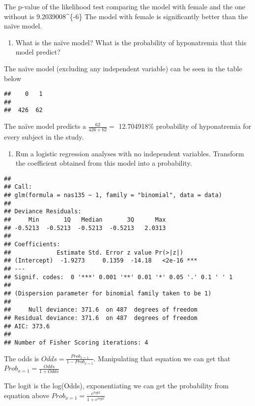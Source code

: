 \documentclass[]{article}
\begin{document}
The p-value of the likelihood test comparing the model with female and
the one without is 9.2039008\^{}\{-6\} The model with female is
significantly better than the naïve model.

\begin{enumerate}
\def\labelenumi{\alph{enumi}.}
\setcounter{enumi}{2}
\itemsep1pt\parskip0pt
\item
  What is the naïve model? What is the probability of hyponatremia that
  this model predict?
\end{enumerate}

The naïve model (excluding any independent variable) can be seen in the
table below

\begin{verbatim}
##    0   1
##         
##  426  62
\end{verbatim}

The naïve model predicts a $\frac{62}{426+62}=$ 12.704918\% probability
of hyponatremia for every subject in the study.

\begin{enumerate}
\def\labelenumi{\alph{enumi}.}
\setcounter{enumi}{3}
\itemsep1pt\parskip0pt
\item
  Run a logistic regression analyses with no independent variables.
  Transform the coefficient obtained from this model into a probability.
\end{enumerate}

\begin{verbatim}
## 
## Call:
## glm(formula = nas135 ~ 1, family = "binomial", data = data)
## 
## Deviance Residuals: 
##     Min       1Q   Median       3Q      Max  
## -0.5213  -0.5213  -0.5213  -0.5213   2.0313  
## 
## Coefficients:
##             Estimate Std. Error z value Pr(>|z|)    
## (Intercept)  -1.9273     0.1359  -14.18   <2e-16 ***
## ---
## Signif. codes:  0 '***' 0.001 '**' 0.01 '*' 0.05 '.' 0.1 ' ' 1
## 
## (Dispersion parameter for binomial family taken to be 1)
## 
##     Null deviance: 371.6  on 487  degrees of freedom
## Residual deviance: 371.6  on 487  degrees of freedom
## AIC: 373.6
## 
## Number of Fisher Scoring iterations: 4
\end{verbatim}

The odds is $Odds=\frac{Prob_{x=1}}{1-Prob_{x=1}}$. Manipulating that
equation we can get that $Prob_{x=1}=\frac{Odds}{1+Odds}$

The logit is the log(Odds), exponentiating we can get the probability
from equation above $Prob_{x=1}=\frac{e^{logit}}{1+e^{logit}}$
\end{document}
